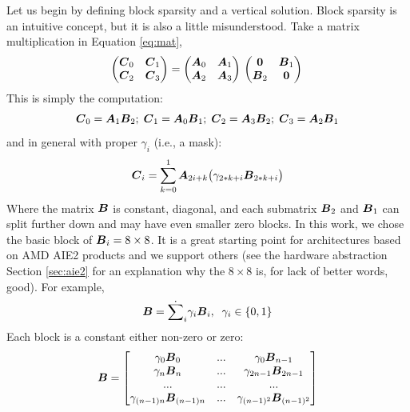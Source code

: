 \documentclass[conference]{IEEEtran}
\begin{document}
Let us begin by defining block sparsity and a vertical solution. Block
sparsity is an intuitive concept, but it is also a little
misunderstood. Take a matrix multiplication in Equation
\ref{eq:mat},
\begin{equation}
  \label{eq:mat}
  \begin{pmatrix}
    \Vc{C}_0 & \Vc{C}_1 \\
    \Vc{C}_2 & \Vc{C}_3 \\ 
  \end{pmatrix} = 
  \begin{pmatrix}
    \Vc{A}_0 & \Vc{A}_1 \\
    \Vc{A}_2 & \Vc{A}_3 \\ 
  \end{pmatrix}\\
  \begin{pmatrix}
    \Vc{0}   & \Vc{B}_1 \\
    \Vc{B}_2 & \Vc{0} \\ 
  \end{pmatrix}\\
\end{equation}
This is simply the computation: 
{\small \begin{equation}
  {\boldsymbol C}_0 = {\boldsymbol A}_{1} {\boldsymbol B}_{2}; \;
  {\boldsymbol C}_1 = {\boldsymbol A}_{0} {\boldsymbol B}_{1}; \;
  {\boldsymbol C}_2 = {\boldsymbol A}_{3} {\boldsymbol B}_{2}; \;
  {\boldsymbol C}_3 = {\boldsymbol A}_{2} {\boldsymbol B}_{1}
\end{equation}}
and in general with proper $\gamma_i$ (i.e., a mask):
\begin{equation}
  {\boldsymbol C}_i = \sum_{k=0}^1 {\boldsymbol A}_{2i+ k} \big(\gamma_{2*k+i} {\boldsymbol B}_{2*k+i}\big)
\end{equation}
Where the matrix ${\boldsymbol B}$ is constant, diagonal, and each submatrix
${\boldsymbol B_2}$ and ${\boldsymbol B}_1$ can split further down and may have even
smaller zero blocks. In this work, we chose the basic block of
${\boldsymbol B}_i = 8\times 8$. It is a great starting point for architectures
based on AMD AIE2 products and we support others (see the hardware
abstraction Section \ref{sec:aie2} for an explanation why the $8\times 8$
is, for lack of better words, good).  For example,
\begin{equation}
  {\boldsymbol B} = \dot{\sum}_i \gamma_i {\boldsymbol B}_i, \;\; \gamma_i \in \{0,1\} 
\end{equation}
Each block is a constant either non-zero or zero:
{\small \begin{equation*}
  {\boldsymbol B} = 
  \begin{bmatrix}
    \gamma_0{\boldsymbol B}_0   &  ... &   \gamma_0{\boldsymbol B}_{n-1} \\
    \gamma_n{\boldsymbol B}_{n} &  ... &   \gamma_{2n-1}{\boldsymbol B}_{2n-1} \\
    ...               &  ... &   ... \\
    \gamma_{(n-1)n}{\boldsymbol B}_{(n-1)n} & ... &   \gamma_{(n-1)^2}{\boldsymbol B}_{(n-1)^2} \\
  \end{bmatrix}
\end{equation*}}
\end{document}
